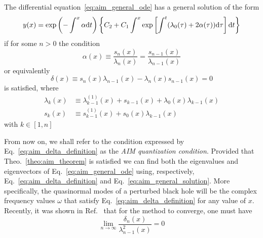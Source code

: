 \begin{theorem}
  The differential equation~\eqref{eq:aim_general_ode} has a general solution of the form
  \begin{equation}
    y(x) = \exp\left( -\int^x\alpha\mathrm{d} t \right) \left\{ C_2 + C_1 \int^{x} \exp \left[ \int^{t} ( \lambda_0(\tau) + 2\alpha(\tau) )\mathrm{d} \tau \right] \mathrm{d} t \right\}
    \label{eq:aim_general_solution}
  \end{equation}
  if for some $n>0$ the condition
  \begin{equation}
    \alpha(x) \equiv \frac{s_n(x)}{\lambda_n(x)} = \frac{s_{n-1}(x)}{\lambda_{n-1}(x)}
    \label{eq:aim_alpha_definition}
  \end{equation}
  or equivalently
  \begin{equation}
    \delta(x) \equiv s_n(x)\lambda_{n-1}(x) - \lambda_{n}(x)s_{n-1}(x) = 0
    \label{eq:aim_delta_definition}
  \end{equation}
  is satisfied, where
  \begin{align}
    \lambda_k(x) & \equiv \lambda^{(1)}_{k-1}(x) + s_{k-1}(x) + \lambda_0(x)\lambda_{k-1}(x) \label{eq:aim_lambda_k} \\
    s_k(x)       & \equiv       s^{(1)}_{k-1}(x) + s_0(x)\lambda_{k-1}(x) \label{eq:aim_sk}
  \end{align}
  with $k \in [1, n]$
  \label{theo:aim_theorem}
\end{theorem}
%
From now on, we shall refer to the condition expressed by Eq.~\eqref{eq:aim_delta_definition} as the \emph{\ac{AIM} quantization condition}. Provided that Theo.~\ref{theo:aim_theorem} is satisfied we can find both the eigenvalues and eigenvectors of Eq.~\eqref{eq:aim_general_ode} using, respectively, Eq.~\eqref{eq:aim_delta_definition} and Eq.~\eqref{eq:aim_general_solution}. More specifically, the quasinormal modes of a perturbed black hole will be the complex frequency values $\omega$ that satisfy Eq.~\eqref{eq:aim_delta_definition} for any value of $x$. Recently, it was shown in Ref.~\cite{Ismail2020} that for the method to converge, one must have
%
\begin{equation}
  \lim_{n \rightarrow \infty} \frac{\delta_n(x)}{\lambda_{n-1}^2(x)} = 0
  \label{eq:aim_convergence_criteria}
\end{equation}

